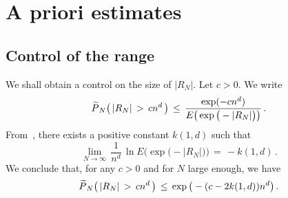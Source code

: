\documentclass[10pt]{amsart}
\theoremstyle{definition}\newtheorem{defi}[theo]{Definition}\newtheorem{rema}[theo]{Remark}\newtheorem{exam}[theo]{Example}\newtheorem{exem}[theo]{Example}\newtheorem{nota}[theo]{Notation}
\newcommand*\wP{\smash{\widetilde P}}
\begin{document}
\section{A priori estimates}\label{S:apriori}


\subsection{Control of the range}\label{conran}
We shall obtain a control on the size of $|R_N|$. Let $c>0$. We write
\[
\wP_N\big(\,|R_N|\,>\,cn^d\,\big)\,\leq\,
\frac{\exp(-cn^d)}{ E\big(
\exp\big(-|R_N|\big)\big)}\,.
\]
From~\cite[Theorem~$1$]{DVRA}, there exists a positive constant $k(1,d)$ such that
\[
\lim_{N\to\infty}\,\frac{1}{n^d}\,\ln
E\big(
\exp\big(-|R_N|\big)\big)\,=\,-k(1,d)\,.
\]
We conclude that, for any $c>0$ and for $N$ large enough, we have
\begin{equation}\label{range}
\wP_N\big(\,|R_N|\,>\,cn^d\,\big)\,\leq\,
\exp\big(-(c-2k(1,d))n^d\big)\,.
\end{equation}
\end{document}
